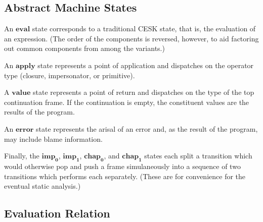 \subsection{Abstract Machine States}

An $\mathbf{eval}$ state corresponds to a traditional CESK state, that is, the evaluation of an expression.
(The order of the components is reversed, however, to aid factoring out common components from among the variants.)

An $\mathbf{apply}$ state represents a point of application and dispatches on the operator type (closure, impersonator, or primitive).

A $\mathbf{value}$ state represents a point of return and dispatches on the type of the top continuation frame.
If the continuation is empty, the constituent values are the results of the program.

An $\mathbf{error}$ state represents the arisal of an error and, as the result of the program, may include blame information.

Finally, the $\mathbf{imp_0}$, $\mathbf{imp_1}$, $\mathbf{chap_0}$, and $\mathbf{chap_1}$ states each split a transition which would otherwise pop and push a frame simulaneously into a sequence of two transitions which performs each separately.
(These are for convenience for the eventual static analysis.)

\subsection{Evaluation Relation}



